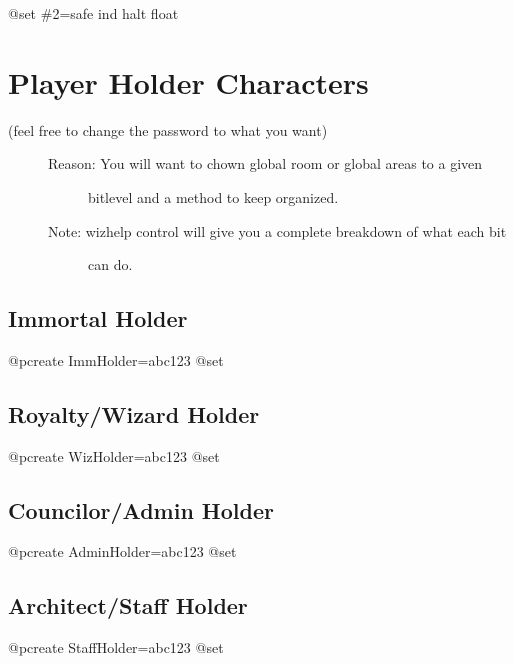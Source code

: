 \documentclass[letterpaper,10pt,english]{sphinxmanual}
\begin{document}
\sphinxAtStartPar
@set \#2=safe ind halt float


\section{Player Holder Characters}
\label{\detokenize{05-newmush:player-holder-characters}}\begin{description}
\item[{(feel free to change the password to what you want)}] \leavevmode\begin{description}
\item[{Reason: You will want to chown global room or global areas to a given}] \leavevmode
\sphinxAtStartPar
bitlevel and a method to keep organized.

\item[{Note: wizhelp control will give you a complete breakdown of what each bit}] \leavevmode
\sphinxAtStartPar
can do.

\end{description}

\end{description}


\subsection{Immortal Holder}
\label{\detokenize{05-newmush:immortal-holder}}
\sphinxAtStartPar
@pcreate ImmHolder=abc123
@set 


\subsection{Royalty/Wizard Holder}
\label{\detokenize{05-newmush:royalty-wizard-holder}}
\sphinxAtStartPar
@pcreate WizHolder=abc123
@set 


\subsection{Councilor/Admin Holder}
\label{\detokenize{05-newmush:councilor-admin-holder}}
\sphinxAtStartPar
@pcreate AdminHolder=abc123
@set 


\subsection{Architect/Staff Holder}
\label{\detokenize{05-newmush:architect-staff-holder}}
\sphinxAtStartPar
@pcreate StaffHolder=abc123
@set 
\end{document}
